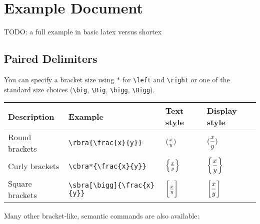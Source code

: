 \documentclass{article}
\begin{document}
\section{Example Document}

TODO: a full example in basic latex versus shortex

\subsection{Paired Delimiters}

You can specify a bracket size using $*$ for \verb!\left! and \verb!\right! or one of the standard size choices (\verb!\big!, \verb!\Big!, \verb!\bigg!, \verb!\Bigg!).

\begin{center}
\begin{tabular}{@{}llll@{}}
\toprule
Description 				& Example					& Text style 				& Display style \\ \midrule
Round brackets	& \verb!\rbra{\frac{x}{y}}!        	& $\rbra{\frac{x}{y}}$ 		& $\displaystyle\rbra{\frac{x}{y}}$ \\[10pt]
Curly brackets 			& \verb!\cbra*{\frac{x}{y}}!    	& $\cbra*{\frac{x}{y}}$ 	& $\displaystyle\cbra*{\frac{x}{y}}$ \\[10pt]
Square brackets 			& \verb!\sbra[\bigg]{\frac{x}{y}}!        	& $\sbra[\bigg]{\frac{x}{y}}$ 	& $\displaystyle\sbra[\bigg]{\frac{x}{y}}$ \\[10pt]
\bottomrule
\end{tabular}
\end{center}

Many other bracket-like, semantic commands are also available:
\end{document}
